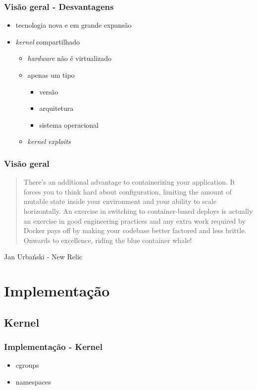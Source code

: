 \documentclass{beamer}
\begin{document}
\begin{frame}
    \frametitle{Visão geral - Desvantagens}
    \begin{itemize}
        \item tecnologia nova e em grande expansão
        \item \textit{kernel} compartilhado
        \begin{itemize}
            \item \textit{hardware} não é virtualizado
            \item apenas um tipo
            \begin{itemize}
                \item versão
                \item arquitetura
                \item sistema operacional
            \end{itemize}
            \item \textit{kernel exploits}
        \end{itemize}
    \end{itemize}
\end{frame}

\begin{frame}
    \frametitle{Visão geral}
    \begin{quote}
        There’s an additional advantage to containerizing your application. It
        forces you to think hard about configuration, limiting the amount of
        mutable state inside your environment and your ability to scale
        horizontally. An exercise in switching to container-based deploys is
        actually an exercise in good engineering practices and any extra work
        required by Docker pays off by making your codebase better factored and
        less brittle. Onwards to excellence, riding the blue container whale!
    \end{quote}
    Jan Urbański - New Relic
\end{frame}

\section{Implementação}

\subsection{Kernel}

\begin{frame}
    \frametitle{Implementação - Kernel}
    \begin{itemize}
        \item cgroups
        \item namespaces
    \end{itemize}
\end{frame}
\end{document}
